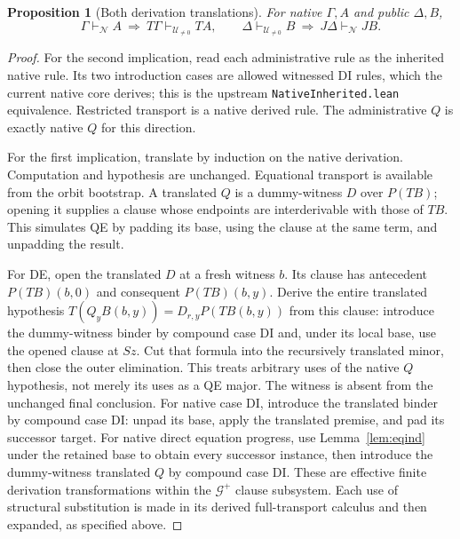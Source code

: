 \documentclass[11pt,letterpaper]{article}
\newtheorem{proposition}[theorem]{Proposition}
\theoremstyle{definition}\newtheorem{definition}[theorem]{Definition}
\theoremstyle{remark}\newtheorem{remark}[theorem]{Remark}
\newcommand{\UR}{\mathcal U_{\ne0}}
\newcommand{\NC}{\mathcal N}
\newcommand{\file}[1]{{\small\nolinkurl{#1}}}
\begin{document}
\begin{proposition}[Both derivation translations]
For native $\Gamma,A$ and public $\Delta,B$,
\[
 \Gamma\vdash_{\NC}A\ \Longrightarrow\ T\Gamma\vdash_{\UR}TA,
 \qquad
 \Delta\vdash_{\UR}B\ \Longrightarrow\ J\Delta\vdash_{\NC}JB.
\]
\end{proposition}
\begin{proof}
For the second implication, read each administrative rule as the inherited
native rule. Its two introduction cases are allowed witnessed DI rules,
which the current native core derives; this is the upstream
\file{NativeInherited.lean} equivalence. Restricted transport is a native
derived rule. The administrative $Q$ is exactly native $Q$ for this direction.

For the first implication, translate by induction on the native derivation.
Computation and hypothesis are unchanged. Equational transport is available
from the orbit bootstrap. A translated $Q$ is a dummy-witness $D$ over
$P(TB)$; opening it supplies a clause whose endpoints are interderivable with
those of $TB$. This simulates QE by padding its base, using the clause at the
same term, and unpadding the result.

For DE, open the translated $D$ at a fresh witness $b$. Its clause has
antecedent $P(TB)(b,0)$ and consequent $P(TB)(b,y)$. Derive the entire
translated hypothesis
$T(Q_yB(b,y))=D_{r,y}P(TB(b,y))$ from this clause: introduce the
dummy-witness binder by compound case DI and, under its local base, use
the opened clause at $Sz$. Cut that formula into the recursively
translated minor, then close the outer elimination. This treats arbitrary
uses of the native $Q$ hypothesis, not merely its uses as a QE major.
The witness is absent from the unchanged final conclusion.
For native case DI, introduce the translated binder by compound case DI:
unpad its base, apply the translated premise, and pad its successor target.
For native direct equation progress, use Lemma~\ref{lem:eqind} under the
retained base to obtain every successor instance, then introduce the
dummy-witness translated $Q$ by compound case DI. These are effective
finite derivation transformations within the $\mathcal G^+$ clause
subsystem. Each use of structural substitution is made in its derived
full-transport calculus and then expanded, as specified above.
\end{proof}
\end{document}

